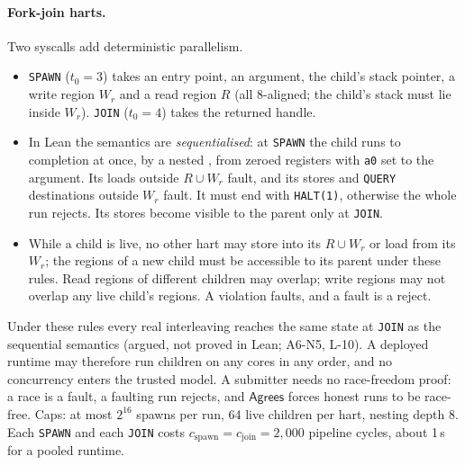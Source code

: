 \paragraph{Fork-join harts.} Two syscalls add deterministic parallelism.
\begin{itemize}[nosep]
\item \texttt{SPAWN} ($t_0=3$) takes an entry point, an argument, the child's stack pointer, a write
  region $W_r$ and a read region $R$ (all 8-aligned; the child's stack must lie inside $W_r$).
  \texttt{JOIN} ($t_0=4$) takes the returned handle.
\item In Lean the semantics are \emph{sequentialised}: at \texttt{SPAWN} the child runs to completion
  at once, by a nested , from zeroed registers with \texttt{a0} set to the argument. Its
  loads outside $R\cup W_r$ fault, and its stores and \texttt{QUERY} destinations outside $W_r$ fault.
  It must end with \texttt{HALT(1)}, otherwise the whole run rejects. Its stores become visible to the
  parent only at \texttt{JOIN}.
\item While a child is live, no other hart may store into its $R\cup W_r$ or load from its $W_r$; the
  regions of a new child must be accessible to its parent under these rules. Read regions of different
  children may overlap; write regions may not overlap any live child's regions. A violation faults, and
  a fault is a reject.
\end{itemize}
Under these rules every real interleaving reaches the same state at \texttt{JOIN} as the sequential
semantics (argued, not proved in Lean; A6-N5, L-10). A deployed runtime may therefore run children on
any cores in any order, and no concurrency enters the trusted model. A submitter needs no race-freedom
proof: a race is a fault, a faulting run rejects, and $\mathsf{Agrees}$ forces honest runs to be
race-free. Caps: at most $2^{16}$ spawns per
run, 64 live children per hart, nesting depth 8. Each \texttt{SPAWN} and each \texttt{JOIN} costs
$c_{\mathrm{spawn}}=c_{\mathrm{join}}=2{,}000$ pipeline cycles, about 1\,\textmu s for a pooled
runtime.

